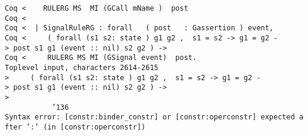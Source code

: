 \documentclass{article}
\begin{document}
{\begin{flushleft}
\texttt{Coq~{<}~~~~RULERG~MS~~MI~(GCall~mName~)~~post}\\
\texttt{Coq~{<}~}\\
\texttt{Coq~{<}~~|~SignalRuleRG~:~forall~~~(~post~~~:~Gassertion~)~event,~}\\
\texttt{Coq~{<}~~~~~(~forall~(s1~s2:~state~)~g1~g2~,~~s1~=~s2~-{>}~g1~=~g2~-{>}~post~s1~g1~(event~::~nil)~s2~g2~)~-{>}~~~}\\
\texttt{Coq~{<}~~~~~RULERG~MS~MI~(GSignal~event)~~post.~}\\
\texttt{Toplevel~input,~characters~2614-2615}\\
\texttt{{>}~~~~~(~forall~(s1~s2:~state~)~g1~g2~,~~s1~=~s2~-{>}~g1~=~g2~-{>}~post~s1~g1~(event~::~nil)~s2~g2~)~-{>}~~~}\\
\texttt{{>}~~~~~~~~~~~~~~~~~~~~~~~~~~~~~~~~~~~~~~~~~~~~~~~~~~~~~~~~~~~~~~~~~~~~~~~~~~~~~~~~\char'136}\\
\texttt{Syntax~error:~[constr:binder\_constr]~or~[constr:operconstr]~expected~after~':'~(in~[constr:operconstr])}\\
\end{flushleft} }
\end{document}
